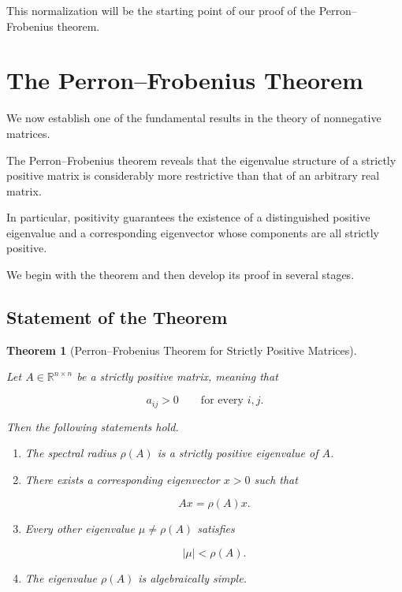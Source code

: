 \documentclass[11pt,a4paper]{article}
\newtheorem{theorem}{Theorem}[section]
\theoremstyle{definition}
\theoremstyle{remark}
\begin{document}
This normalization will be
the starting point of our
proof of the Perron--Frobenius
theorem.

\section{The Perron--Frobenius Theorem}

We now establish one of the fundamental
results in the theory of nonnegative
matrices.

The Perron--Frobenius theorem reveals
that the eigenvalue structure of a
strictly positive matrix is considerably
more restrictive than that of an
arbitrary real matrix.

In particular, positivity guarantees
the existence of a distinguished
positive eigenvalue and a corresponding
eigenvector whose components are all
strictly positive.

We begin with the theorem and then
develop its proof in several stages.


\subsection{Statement of the Theorem}

\begin{theorem}[Perron--Frobenius Theorem
for Strictly Positive Matrices]
\label{thm:perron_frobenius_positive}

Let $A\in\mathbb{R}^{n\times n}$
be a strictly positive matrix,
meaning that

\[
a_{ij}>0
\qquad
\text{for every }i,j.
\]

Then the following statements hold.

\begin{enumerate}[label=(\roman*)]

\item The spectral radius $\rho(A)$
is a strictly positive eigenvalue
of $A$.

\item There exists a corresponding
eigenvector $x>0$ such that

\[
Ax=\rho(A)x.
\]

\item Every other eigenvalue
$\mu\neq\rho(A)$ satisfies

\[
|\mu|<\rho(A).
\]

\item The eigenvalue $\rho(A)$
is algebraically simple.

\end{enumerate}

\end{theorem}
\end{document}
